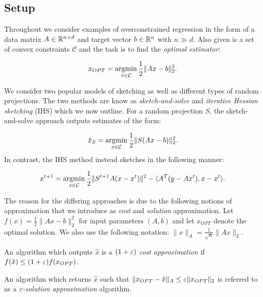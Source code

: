 \subsection{Setup}
Throughout we consider examples of overconstrained regression in the form of
a data matrix $A \in \mathbb{R}^{n \times d}$ and target vector $b \in \mathbb{R}^{n}$ with
$n \gg d$.
Also given is a set of convex constraints $\mathcal{C}$ and the task is to
find the \textit{optimal estimator}:

\begin{equation}
  x_{OPT} = \operatorname*{argmin}_{x \in \mathcal{C}} \frac{1}{2} \|Ax-b\|_2^2.
\end{equation}

We consider two popular models of sketching as well as different types
of random projections.
The two methods are know as \textit{sketch-and-solve} and \textit{iterative
Hessian sketching} (IHS) which we now outline.
For a random projection $S$, the sketch-and-solve approach outputs estimates
of the form:

\begin{equation} \label{eq: sketch-and-solve}
  \hat{x}_S = \operatorname*{argmin}_{x \in \mathcal{C}} \frac{1}{2} \|S(Ax-b)\|_2^2.
\end{equation}
\noindent In contrast, the IHS method instead sketches in the following manner:

\begin{equation} \label{eq: ihs}
  x^{t+1} = \operatorname*{argmin}_{x \in \mathcal{C}}  \frac{1}{2} \|S^{t+1} A
  (x - x^t) \|^2 - \langle A^T (y - Ax^t), x - x^t \rangle.
\end{equation}

The reason for the differing approaches is due to the following notions of
approximation that we introduce as \textit{cost} and \textit{solution}
approximation.
Let $f(x) = \frac{1}{2}\|Ax-b\|_2^2$ for input parameters $(A,b)$ and let
$x_{OPT}$ denote the optimal solution.
We also use the following notation: $\|x\|_A = \frac{1}{\sqrt{n}}\|Ax\|_2$.

\begin{mydef} \label{def: cost-approx}
  An algorithm which outputs $\hat{x}$ is a $(1 + \varepsilon)$ \textit{cost
   approximation} if $f(\hat{x}) \le (1+\varepsilon) f(x_{OPT})$.
\end{mydef}

\begin{mydef} \label{def: sol-approx}
  An algorithm which returns $\hat{x}$ such that $\|x_{OPT} - \hat{x}\|_A
  \le \varepsilon \|x_{OPT}\|_2$ is referred to as a $\varepsilon$-\textit{solution
  approximation} algorithm.
\end{mydef}

